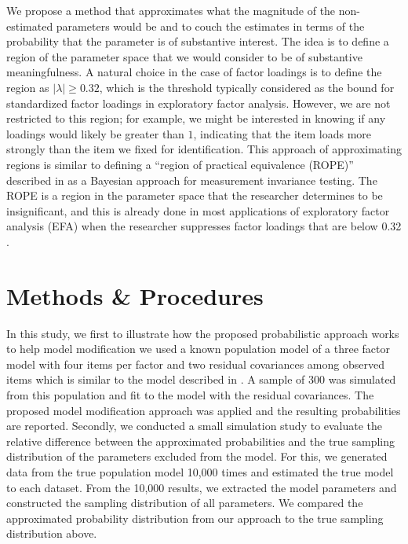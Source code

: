 \documentclass[man, noextraspace, floatsintext, 12pt]{apa7}
\begin{document}
We propose a method that approximates what the magnitude of the non-estimated parameters would be and to couch the estimates in terms of the probability that the parameter is of substantive interest.
The idea is to define a region of the parameter space that we would consider to be of substantive meaningfulness.
A natural choice in the case of factor loadings is to define the region as $\vert \lambda \vert \geq 0.32$, which is the threshold typically considered as the bound for standardized factor loadings in exploratory factor analysis.
However, we are not restricted to this region; for example, we might be interested in knowing if any loadings would likely be greater than $1$, indicating that the item loads more strongly than the item we fixed for identification.
This approach of approximating regions is similar to defining a ``region of practical equivalence (ROPE)'' described in \textcite{Shi2019} as a Bayesian approach for measurement invariance testing.
The ROPE is a region in the parameter space that the researcher determines to be insignificant, and this is already done in most applications of exploratory factor analysis (EFA) when the researcher suppresses factor loadings that are below 0.32 \citep{Benson1998}.

\section*{Methods \& Procedures}
In this study, we first to illustrate how the proposed probabilistic approach works to help model modification we used a known population model of a three factor model with four items per factor and two residual covariances among observed items which is similar to the model described in \citep{Bollen2019}.
A sample of 300 was simulated from this population and fit to the model with the residual covariances.
The proposed model modification approach was applied and the resulting probabilities are reported.
Secondly, we conducted a small simulation study to evaluate the relative difference between the approximated probabilities and the true sampling distribution of the parameters excluded from the model.
For this, we generated data from the true population model 10,000 times and estimated the true model to each dataset.
From the 10,000 results, we extracted the model parameters and constructed the sampling distribution of all parameters.
We compared the approximated probability distribution from our approach to the true sampling distribution above.
\end{document}
